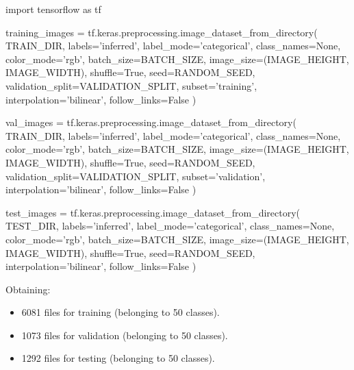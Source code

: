 \begin{python}
import tensorflow as tf

training_images = tf.keras.preprocessing.image_dataset_from_directory(
    TRAIN_DIR, labels='inferred', label_mode='categorical',
    class_names=None, color_mode='rgb', batch_size=BATCH_SIZE, 
    image_size=(IMAGE_HEIGHT,  IMAGE_WIDTH), shuffle=True, seed=RANDOM_SEED, 
    validation_split=VALIDATION_SPLIT, subset='training',
    interpolation='bilinear', follow_links=False
)

val_images = tf.keras.preprocessing.image_dataset_from_directory(
    TRAIN_DIR, labels='inferred', label_mode='categorical',
    class_names=None, color_mode='rgb', batch_size=BATCH_SIZE,
    image_size=(IMAGE_HEIGHT, IMAGE_WIDTH), shuffle=True, seed=RANDOM_SEED,
    validation_split=VALIDATION_SPLIT, subset='validation',
    interpolation='bilinear', follow_links=False
)

test_images = tf.keras.preprocessing.image_dataset_from_directory(
    TEST_DIR, labels='inferred', label_mode='categorical',
    class_names=None, color_mode='rgb', batch_size=BATCH_SIZE, 
    image_size=(IMAGE_HEIGHT, IMAGE_WIDTH), shuffle=True, seed=RANDOM_SEED,
    interpolation='bilinear', follow_links=False
)
\end{python}

\noindent Obtaining:
 \begin{itemize}
	\item 6081 files for training (belonging to 50 classes).
	\item 1073 files for validation (belonging to 50 classes).
	\item 1292 files for testing (belonging to 50 classes).
\end{itemize}

